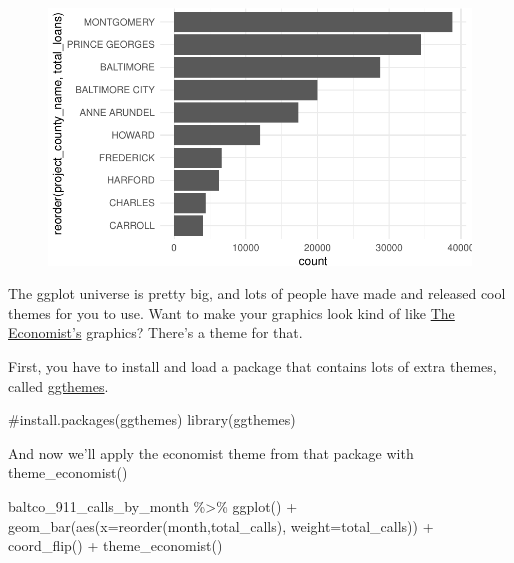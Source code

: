 \documentclass[
  letterpaper,
  DIV=11,
  numbers=noendperiod]{scrreprt}
\newenvironment{Shaded}{\begin{snugshade}}{\end{snugshade}}
\newcommand{\AttributeTok}[1]{\textcolor[rgb]{0.40,0.45,0.13}{#1}}
\newcommand{\CommentTok}[1]{\textcolor[rgb]{0.37,0.37,0.37}{#1}}
\newcommand{\FunctionTok}[1]{\textcolor[rgb]{0.28,0.35,0.67}{#1}}
\newcommand{\NormalTok}[1]{\textcolor[rgb]{0.00,0.23,0.31}{#1}}
\newcommand{\SpecialCharTok}[1]{\textcolor[rgb]{0.37,0.37,0.37}{#1}}
\begin{document}
\begin{figure}[H]

{\centering \includegraphics{./visualizing-for-reporting_files/figure-pdf/unnamed-chunk-8-1.pdf}

}

\end{figure}

The ggplot universe is pretty big, and lots of people have made and
released cool themes for you to use. Want to make your graphics look
kind of like \href{https://www.economist.com/}{The Economist's}
graphics? There's a theme for that.

First, you have to install and load a package that contains lots of
extra themes, called
\href{https://yutannihilation.github.io/allYourFigureAreBelongToUs/ggthemes/}{ggthemes}.

\begin{Shaded}
\begin{Highlighting}[]
\CommentTok{\#install.packages(\textquotesingle{}ggthemes\textquotesingle{})}
\FunctionTok{library}\NormalTok{(ggthemes)}
\end{Highlighting}
\end{Shaded}

And now we'll apply the economist theme from that package with
theme\_economist()

\begin{Shaded}
\begin{Highlighting}[]
\NormalTok{baltco\_911\_calls\_by\_month }\SpecialCharTok{\%\textgreater{}\%}
  \FunctionTok{ggplot}\NormalTok{() }\SpecialCharTok{+}
  \FunctionTok{geom\_bar}\NormalTok{(}\FunctionTok{aes}\NormalTok{(}\AttributeTok{x=}\FunctionTok{reorder}\NormalTok{(month,total\_calls), }\AttributeTok{weight=}\NormalTok{total\_calls)) }\SpecialCharTok{+}
  \FunctionTok{coord\_flip}\NormalTok{() }\SpecialCharTok{+} 
  \FunctionTok{theme\_economist}\NormalTok{()}
\end{Highlighting}
\end{Shaded}
\end{document}
